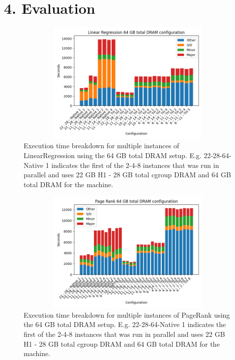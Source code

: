 \documentclass[twocolumn,10pt]{asme2e}
\begin{document}
\section*{4. Evaluation}
\begin{figure}[ht]
	\includegraphics[width=13cm,height=6cm]{lr64.png}
	\caption{Execution time breakdown for multiple instances of LinearRegression using the 64 GB total DRAM setup. 
	E.g. 22-28-64-Native 1 indicates the first of the 2-4-8 instances that was run in parallel and uses 22 GB H1 - 28 GB total cgroup DRAM and 64 GB total DRAM for the machine.}
	\label{fig:lr64}
\end{figure}

\begin{figure}[ht]
        \includegraphics[width=13cm,height=6cm]{pr64.png}
	\caption{Execution time breakdown for multiple instances of PageRank using the 64 GB total DRAM setup. 
	E.g. 22-28-64-Native 1 indicates the first of the 2-4-8 instances that was run in parallel and uses 22 GB H1 - 28 GB total cgroup DRAM and 64 GB total DRAM for the machine.}
	\label{fig:pr64}
\end{figure}
\end{document}
